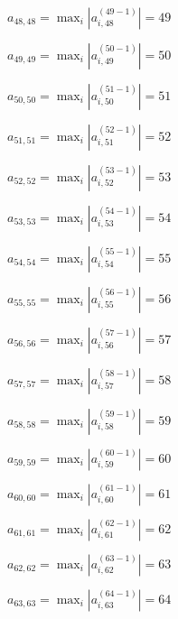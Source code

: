 \documentclass[a4paper,12pt]{article}
\begin{document}
$a _{ 48, 48 } =  \max _i |a _{ i, 48 } ^{ (49 - 1) } | = 49$

$a _{ 49, 49 } =  \max _i |a _{ i, 49 } ^{ (50 - 1) } | = 50$

$a _{ 50, 50 } =  \max _i |a _{ i, 50 } ^{ (51 - 1) } | = 51$

$a _{ 51, 51 } =  \max _i |a _{ i, 51 } ^{ (52 - 1) } | = 52$

$a _{ 52, 52 } =  \max _i |a _{ i, 52 } ^{ (53 - 1) } | = 53$

$a _{ 53, 53 } =  \max _i |a _{ i, 53 } ^{ (54 - 1) } | = 54$

$a _{ 54, 54 } =  \max _i |a _{ i, 54 } ^{ (55 - 1) } | = 55$

$a _{ 55, 55 } =  \max _i |a _{ i, 55 } ^{ (56 - 1) } | = 56$

$a _{ 56, 56 } =  \max _i |a _{ i, 56 } ^{ (57 - 1) } | = 57$

$a _{ 57, 57 } =  \max _i |a _{ i, 57 } ^{ (58 - 1) } | = 58$

$a _{ 58, 58 } =  \max _i |a _{ i, 58 } ^{ (59 - 1) } | = 59$

$a _{ 59, 59 } =  \max _i |a _{ i, 59 } ^{ (60 - 1) } | = 60$

$a _{ 60, 60 } =  \max _i |a _{ i, 60 } ^{ (61 - 1) } | = 61$

$a _{ 61, 61 } =  \max _i |a _{ i, 61 } ^{ (62 - 1) } | = 62$

$a _{ 62, 62 } =  \max _i |a _{ i, 62 } ^{ (63 - 1) } | = 63$

$a _{ 63, 63 } =  \max _i |a _{ i, 63 } ^{ (64 - 1) } | = 64$
\end{document}
